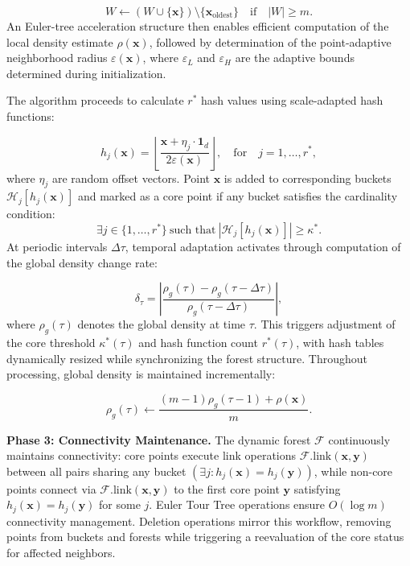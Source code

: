 \documentclass[preprint,12pt,authoryear]{elsarticle}
\theoremstyle{definition}
\begin{document}
\begin{equation} 
W \leftarrow (W \cup \{\bm{x}\}) \setminus \{\bm{x}_{\text{oldest}}\} \quad \text{if} \quad |W| \geq m.
\end{equation}
\noindent An Euler-tree acceleration structure then enables efficient computation of the local density estimate $\rho(\bm{x})$, followed by determination of the point-adaptive neighborhood radius $\varepsilon(\bm{x})$, where $\varepsilon_L$ and $\varepsilon_H$ are the adaptive bounds determined during initialization.

The algorithm proceeds to calculate $r^*$ hash values using scale-adapted hash functions:

\begin{equation}
h_j(\bm{x}) = \left\lfloor \frac{\bm{x} + \eta_j \cdot \mathbf{1}_d}{2\varepsilon(\bm{x})} \right\rfloor, \quad \text{for} \quad j = 1,\dots,r^*,
\end{equation}
\noindent where $\eta_j$ are random offset vectors. Point $\bm{x}$ is added to corresponding buckets $\mathcal{H}_j[h_j(\bm{x})]$ and marked as a core point if any bucket satisfies the cardinality condition:
\begin{equation}
\exists j \in \{1,\dots,r^*\} ~\text{such that}~ \left|\mathcal{H}_j[h_j(\bm{x})]\right| \geq \kappa^*.
\end{equation}
\noindent At periodic intervals $\Delta\tau$, temporal adaptation activates through computation of the global density change rate:

\begin{equation}
\delta_\tau = \left| \frac{\rho_g(\tau) - \rho_g(\tau-\Delta \tau)}{\rho_g(\tau-\Delta \tau)} \right|,
\end{equation}
\noindent where $\rho_g(\tau)$ denotes the global density at time $\tau$. This triggers adjustment of the core threshold $\kappa^*(\tau)$  and hash function count $r^*(\tau)$, with hash tables dynamically resized while synchronizing the forest structure. Throughout processing, global density is maintained incrementally:

\begin{equation}
\rho_g(\tau) \leftarrow \frac{(m-1)\rho_g(\tau-1) + \rho(\bm{x})}{m}.
\end{equation}

\textbf{Phase 3: Connectivity Maintenance.}
The dynamic forest $\mathcal{F}$ continuously maintains connectivity: core points execute link operations $\mathcal{F}.\text{link}(\bm{x}, \bm{y})$ between all pairs sharing any bucket $(\exists j: h_j(\bm{x}) = h_j(\bm{y}))$, while non-core points connect via $\mathcal{F}.\text{link}(\bm{x}, \bm{y})$ to the first core point $\bm{y}$ satisfying $h_j(\bm{x}) = h_j(\bm{y})$ for some $j$. Euler Tour Tree operations ensure $O(\log m)$ connectivity management. Deletion operations mirror this workflow, removing points from buckets and forests while triggering a reevaluation of the core status for affected neighbors.
\end{document}
